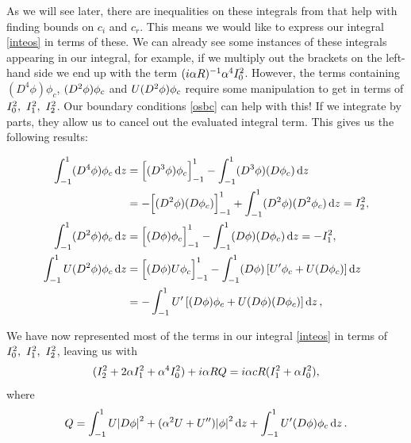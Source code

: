 As we will see later, there are inequalities on these integrals from \citet{joseph1969eigenvalue} that help with finding bounds on $ c_i $ and $ c_r$. This means we would like to express our integral \eqref{inteos} in terms of these. We can already see some instances of these integrals appearing in our integral, for example, if we multiply out the brackets on the left-hand side we end up with the term $ (i \al R)^{-1} \al^4 \I{0} $. However, the terms containing $ (D^4 \phi) \phi_c $, $ (D^2 \p) \p_c $ and $ U (D^2 \p) \p_c $ require some manipulation to get in terms of $ \I{0},\ \I{1},\ \I{2}$. Our boundary conditions \eqref{osbc} can help with this! If we integrate by parts, they allow us to cancel out the evaluated integral term. This gives us the following results:


\begin{subequations}
    \begin{align}
        \inte{1}{-1}{(D^4 \phi) \phi_c}{z} &= \ieval{1}{-1}{(D^3 \phi) \phi_c} -\inte{1}{-1}{(D^3 \phi) (D \phi_c)}{z} \nonumber\\
        &= -\ieval{1}{-1}{(D^2 \phi)(D \phi_c)} + \inte{1}{-1}{(D^2 \phi)(D^2 \phi_c)}{z} = I^2_2, \\
        \inte{1}{-1}{(D^2 \phi) \phi_c}{z} &= \ieval{1}{-1}{(D \phi) \phi_c} - \inte{1}{-1}{(D \phi)(D \phi_c)}{z} = -I^2_1, \\
        \inte{1}{-1}{U (D^2 \phi) \phi_c}{z} &= \ieval{1}{-1}{(D \phi) U \phi_c} - \inte{1}{-1}{(D \phi)\qb{U' \phi_c + U (D \phi_c)}}{z} \nonumber\\ &= -\inte{1}{-1}{U' \qb{(D \phi)\phi_c + U (D \phi)(D \phi_c)}}{z},
    \end{align}
\end{subequations}

We have now represented most of the terms in our integral \eqref{inteos} in terms of $ \I{0},\ \I{1},\ \I{2}$, leaving us with
\begin{equation}
    (\I{2} + 2 \alpha \I{1} + \alpha^4 \I{0}) + i \alpha R Q = i \alpha c R (\I{1} + \alpha \I{0}),
\label{simpintos}
\end{equation}
where 
\begin{equation}
    Q = \inte{1}{-1}{U \abs{D \phi}^2 + (\alpha^2 U + U'') \abs{\phi}^2}{z} + \inte{1}{-1}{U' (D \phi) \phi_c}{z}.
\end{equation} 

